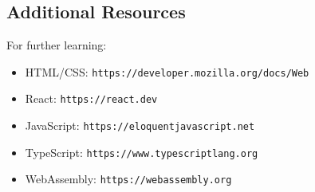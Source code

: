 \subsection{Additional Resources}
For further learning:
\begin{itemize}
    \item HTML/CSS: \texttt{https://developer.mozilla.org/docs/Web}
    \item React: \texttt{https://react.dev}
    \item JavaScript: \texttt{https://eloquentjavascript.net}
    \item TypeScript: \texttt{https://www.typescriptlang.org}
    \item WebAssembly: \texttt{https://webassembly.org}
\end{itemize}